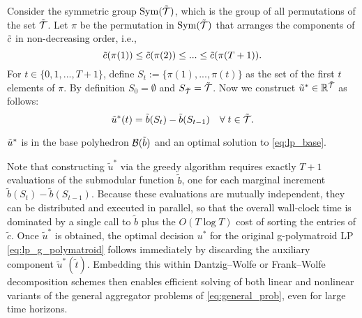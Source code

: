 Consider the symmetric group $\mathrm{Sym}(\Tilde{\mathcal{T}})$, which is the group of all permutations of the set $\Tilde{\mathcal{T}}$. Let $\pi$ be the permutation in $\mathrm{Sym}(\Tilde{\mathcal{T}})$ that arranges the components of $\Tilde{c}$ in non-decreasing order, i.e.,
\begin{equation}\label{eq:cost_order}
    \Tilde{c}(\pi(1)) \leq \Tilde{c}(\pi(2)) \leq ... \leq \Tilde{c}(\pi(T+1)). 
\end{equation}
For $t \in \{0, 1,..., T + 1\}$, define $S_t := \{\pi(1), ..., \pi(t)\}$ as the set of the first $t$ elements of $\pi$. By definition $S_0 = \emptyset$ and $S_{\Tilde{\mathcal{T}}} = \Tilde{\mathcal{T}}$. 
Now we construct $\Tilde{u}^* \in \mathbb{R}^{\Tilde{\mathcal{T}}}$ as follows:
\begin{equation}
    \Tilde{u}^*(t) = \Tilde{b}(S_t) - \Tilde{b}(S_{t-1}) \quad \forall \; t \in \Tilde{\mathcal{T}}.
\end{equation}


\begin{theorem}\label{thm:greedy_alg}\cite[Theorem 14.5.2]{Frank2011ConnectionsOptimization}
    $\Tilde{u}^*$ is in the base polyhedron $\mathcal{B}(\Tilde{b})$ and an optimal solution to \eqref{eq:lp_base}.
\end{theorem}
\begin{remark}   
Note that constructing \(\tilde u^*\) via the greedy algorithm requires exactly \(T+1\) evaluations of the submodular function \(\tilde b\), one for each marginal increment \(\tilde b(S_t)-\tilde b(S_{t-1})\).  Because these evaluations are mutually independent, they can be distributed and executed in parallel, so that the overall wall‐clock time is dominated by a single call to \(\tilde b\) plus the \(O(T\log T)\) cost of sorting the entries of \(\tilde c\).  Once \(\tilde u^*\) is obtained, the optimal decision \(u^*\) for the original g-polymatroid LP \eqref{eq:lp_g_polymatroid} follows immediately by discarding the auxiliary component \(\tilde u^*(\tilde t)\).  Embedding this within Dantzig–Wolfe or Frank–Wolfe decomposition schemes then enables efficient solving of both linear and nonlinear variants of the general aggregator problems of \eqref{eq:general_prob}, even for large time horizons.  
\end{remark}

